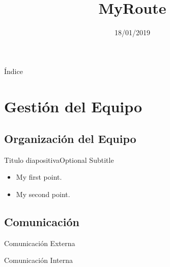 \documentclass{beamer}
\title{MyRoute}
\date{18/01/2019}
\begin{document}
\begin{frame}
  \titlepage 
\end{frame}

\begin{frame}{\'Indice}
  \tiny 
  \tableofcontents
\end{frame}

\section{Gesti\'on del Equipo}

\subsection{Organizaci\'on del Equipo}

\begin{frame}{Titulo diapositiva}{Optional Subtitle}
  \begin{itemize}
  \item {
    My first point.
  }
  \item {
    My second point.
  }
  \end{itemize}
\end{frame}

\subsection{Comunicaci\'on}

\begin{frame}{Comunicaci\'on Externa}
	\begin{figure}[H]
	\centering
	\hspace{0.7cm}
	\end{figure}

\end{frame}

\begin{frame}{Comunicaci\'on Interna}
	\begin{figure}[H]
	\centering
	\hspace{0.7cm}
	\hspace{0.7cm}
	\end{figure}

\end{frame}
\end{document}
